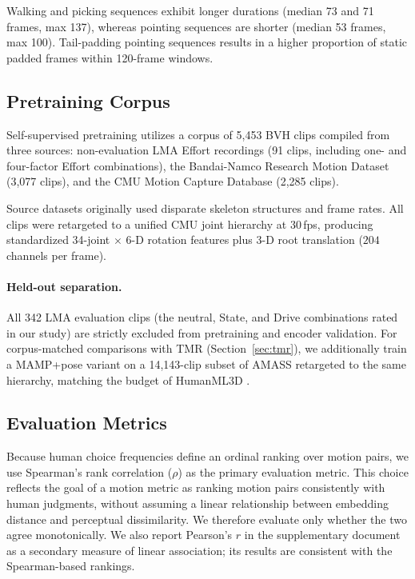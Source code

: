 \documentclass[letterpaper]{article} %
\begin{document}
Walking and picking sequences exhibit longer durations (median 73 and 71 frames, max 137),
whereas pointing sequences are shorter (median 53 frames, max 100). Tail-padding pointing
sequences results in a higher proportion of static padded frames within 120-frame windows.

\subsection{Pretraining Corpus}
\label{sec:corpus}
Self-supervised pretraining utilizes a corpus of 5,453 BVH clips compiled from three sources:
non-evaluation LMA Effort recordings (91 clips, including one- and four-factor Effort combinations), the Bandai-Namco Research Motion Dataset \citep{kobayashi2023bandai} (3,077 clips), and the CMU Motion Capture Database \citep{cmumocap} (2,285 clips).

Source datasets originally used disparate skeleton structures and frame rates. All clips were
retargeted to a unified CMU joint hierarchy at 30\,fps, producing standardized 34-joint
$\times$ 6-D rotation features plus 3-D root translation ($204$ channels per frame).

\paragraph{Held-out separation.}

All 342 LMA evaluation clips (the neutral, State, and Drive combinations rated in our study) are strictly excluded from pretraining and encoder validation. For corpus-matched comparisons with TMR
(Section~\ref{sec:tmr}), we additionally train a MAMP+pose variant on a 14,143-clip subset of
AMASS \citep{mahmood2019amass} retargeted to the same hierarchy, matching the budget of
HumanML3D \citep{guo2022humanml3d}.

\subsection{Evaluation Metrics}
Because human choice frequencies define an ordinal ranking over motion pairs, we use Spearman's rank correlation ($\rho$)  as the primary evaluation metric. This choice reflects the goal of a motion metric as ranking motion pairs consistently with human judgments, without assuming a linear relationship between embedding distance and perceptual dissimilarity.  We therefore evaluate only whether the two agree monotonically. We also report Pearson’s $r$ in the supplementary document as a secondary measure of linear association; its results are consistent with the Spearman-based rankings.
\end{document}
